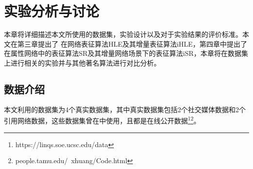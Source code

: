 \chapter{实验分析与讨论}
本章将详细描述本文所使用的数据集，实验设计以及对于实验结果的评价标准。本文在第三章提出了
在网络表征算法HLE及其增量表征算法iHLE，第四章中提出了在属性网络中的表征算法SR及其增量网络场景下的表征算法iSR，本章将在数据集上进行相关的实验并与其他著名算法进行对比分析。

\section{数据介绍}
本文利用的数据集为4个真实数据集，其中真实数据集包括2个社交媒体数据和2个引用网络数据，这些数据集曾在\cite{li2017attributed,tang2015line}中使用，且都是在线公开数据\footnote{https://linqs.soe.ucsc.edu/data}\footnote{people.tamu.edu/~xhuang/Code.html}。
